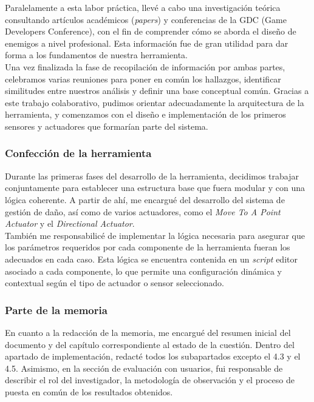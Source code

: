 Paralelamente a esta labor práctica, llevé a cabo una investigación teórica consultando artículos académicos (\textit{papers}) y conferencias de la GDC (Game Developers Conference), con el fin de comprender cómo se aborda el diseño de enemigos a nivel profesional. Esta información fue de gran utilidad para dar forma a los fundamentos de nuestra herramienta.\\

Una vez finalizada la fase de recopilación de información por ambas partes, celebramos varias reuniones para poner en común los hallazgos, identificar similitudes entre nuestros análisis y definir una base conceptual común. Gracias a este trabajo colaborativo, pudimos orientar adecuadamente la arquitectura de la herramienta, y comenzamos con el diseño e implementación de los primeros sensores y actuadores que formarían parte del sistema.\\

\subsubsection*{Confección de la herramienta}

Durante las primeras fases del desarrollo de la herramienta, decidimos trabajar conjuntamente para establecer una estructura base que fuera modular y con una lógica coherente. A partir de ahí, me encargué del desarrollo del sistema de gestión de daño, así como de varios actuadores, como el \textit{Move To A Point Actuator} y el \textit{Directional Actuator}. \\

También me responsabilicé de implementar la lógica necesaria para asegurar que los parámetros requeridos por cada componente de la herramienta fueran los adecuados en cada caso. Esta lógica se encuentra contenida en un \textit{script} editor asociado a cada componente, lo que permite una configuración dinámica y contextual según el tipo de actuador o sensor seleccionado.\\

\subsubsection*{Parte de la memoria}

En cuanto a la redacción de la memoria, me encargué del resumen inicial del documento y del capítulo correspondiente al estado de la cuestión. Dentro del apartado de implementación, redacté todos los subapartados excepto el 4.3 y el 4.5. Asimismo, en la sección de evaluación con usuarios, fui responsable de describir el rol del investigador, la metodología de observación y el proceso de puesta en común de los resultados obtenidos.\\

